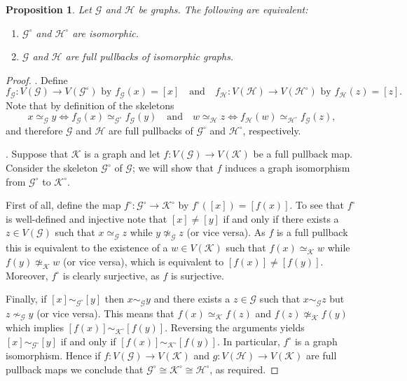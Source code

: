 \documentclass[11pt]{amsart}
\numberwithin{equation}{section}
\theoremstyle{plain}
\newtheorem{proposition}[theorem]{Proposition}
\theoremstyle{definition}
\theoremstyle{remark}
\newcommand{\G}{{\mathcal{G}}}
\renewcommand{\H}{{\mathcal{H}}}
\newcommand{\K}{{\mathcal{K}}}
\newcommand{\qand}{\quad\text{and}\quad}
\begin{document}
\begin{proposition}\label{P:Redgr}
Let $\G$ and $\H$ be graphs. The following are equivalent:
\begin{enumerate}
\item $\G^\circ$ and $\H^\circ$ are isomorphic.
\item $\G$ and $\H$ are full pullbacks of isomorphic graphs.
\end{enumerate}
\end{proposition}
\begin{proof}
\noindent
[(i) $\Rightarrow$ (ii)]. Define
\[
f_\G \colon V(\G) \to V(\G^\circ) \text{ by } f_\G(x)=[x] \qand f_\H \colon V(\H) \to V(\H^\circ) \text{ by } f_\H(z)=[z].
\]
Note that by definition of the skeletons 
\[
x\simeq_\G y \Leftrightarrow f_\G(x)\simeq_{\G^\circ} f_\G(y) \qand w\simeq_\H z \Leftrightarrow f_\H(w)\simeq_{\H^\circ} f_\G(z),
\]
and therefore $\G$ and $\H$ are full pullbacks of $\G^\circ$ and $\H^\circ$, respectively.

\medskip
\noindent
[(ii) $\Rightarrow$ (i)]. Suppose that $\K$ is a graph and let $f \colon V(\G) \to V(\K)$ be a full pullback map. Consider the skeleton $ \G^\circ$ of $\G$; we will show that $f$ induces a graph isomorphism from $ \G^\circ$ to $\K^\circ$. 

First of all, define the map $ f^\circ \colon \G^\circ \to \K^\circ$ by $ f^\circ([x])= [f(x)]$. To see that $f^\circ$ is well-defined and injective note that $[x] \neq [y]$  if and only if there exists a $z \in V(\G)$ such that $x \simeq_{\G} z$ while $y \not\simeq_{\G} z$ (or vice versa). 
As $f$ is a full pullback this is equivalent to the existence of a $w \in V(\K)$ such that 
$f(x) \simeq_{\K} w$ while  $f(y) \not\simeq_{\K} w$ (or vice versa), which is equivalent to $[f(x)] \neq [f(y)]$.
Moreover, $f^\circ$ is clearly surjective, as $f$ is surjective.

Finally, if $ [x]\sim_{\G^\circ} [y]$ then $x \sim_{\G}y$ and there exists a $z \in \G$ such that $x \sim_{\G} z$ but $ z \nsim_{\G} y$ (or vice versa). This means that $ f(x) \simeq_{\K} f(z)$ and $ f(z) \not \simeq_{\K} f(y) $ which implies $ [f(x)] \sim_{\K^\circ} [f(y)]$. Reversing the arguments yields $ [x] \sim_{\G^\circ} [y]$ if and only if $ [f(x)] \sim_{\K^\circ} [f(y)]$. In particular, $f^\circ$ is a graph isomorphism. Hence if $f \colon V(\G) \to V(\K)$ and $ g\colon V(\H) \to V(\K) $ are full pullback maps we conclude that $\G^\circ \cong \K^\circ \cong \H^\circ$, as required.
\end{proof}
\end{document}
